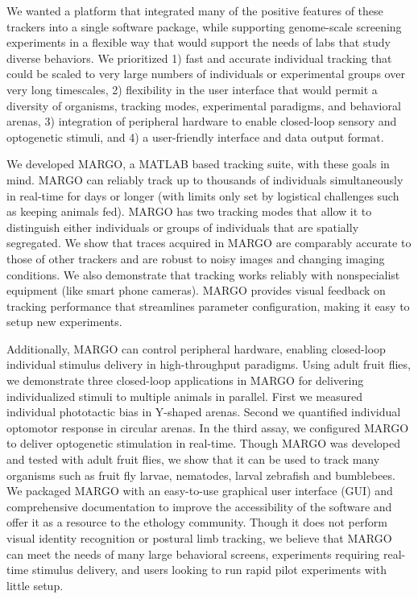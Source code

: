 \documentclass[10pt]{article}
\begin{document}
\begin{multicols}{2}
We wanted a platform that integrated many of the positive features of these trackers into a single software package, while supporting genome-scale screening experiments in a flexible way that would support the needs of labs that study diverse behaviors. We prioritized 1) fast and accurate individual tracking that could be scaled to very large numbers of individuals or experimental groups over very long timescales, 2) flexibility in the user interface that would permit a diversity of organisms, tracking modes, experimental paradigms, and behavioral arenas, 3) integration of peripheral hardware to enable closed-loop sensory and optogenetic stimuli, and 4) a user-friendly interface and data output format. 

We developed MARGO, a MATLAB based tracking suite, with these goals in mind. MARGO can reliably track up to thousands of individuals simultaneously in real-time for days or longer (with limits only set by logistical challenges such as keeping animals fed). MARGO has two tracking modes that allow it to distinguish either individuals or groups of individuals that are spatially segregated. We show that traces acquired in MARGO are comparably accurate to those of other trackers and are robust to noisy images and changing imaging conditions. We also demonstrate that tracking works reliably with nonspecialist equipment (like smart phone cameras). MARGO provides visual feedback on tracking performance that streamlines parameter configuration, making it easy to setup new experiments. 

Additionally, MARGO can control peripheral hardware, enabling closed-loop individual stimulus delivery in high-throughput paradigms. Using adult fruit flies, we demonstrate three closed-loop\cite{heisenberg_wolf_1984} applications in MARGO for delivering individualized stimuli to multiple animals in parallel. First we measured individual phototactic bias in Y-shaped arenas. Second we quantified individual optomotor response in circular arenas. In the third assay, we configured MARGO to deliver optogenetic stimulation in real-time. Though MARGO was developed and tested with adult fruit flies, we show that it can be used to track many organisms such as fruit fly larvae, nematodes, larval zebrafish and bumblebees. We packaged MARGO with an easy-to-use graphical user interface (GUI) and comprehensive documentation to improve the accessibility of the software and offer it as a resource to the ethology community. Though it does not perform visual identity recognition or postural limb tracking, we believe that MARGO can meet the needs of many large behavioral screens, experiments requiring real-time stimulus delivery, and users looking to run rapid pilot experiments with little setup.


\end{multicols}
\end{document}
